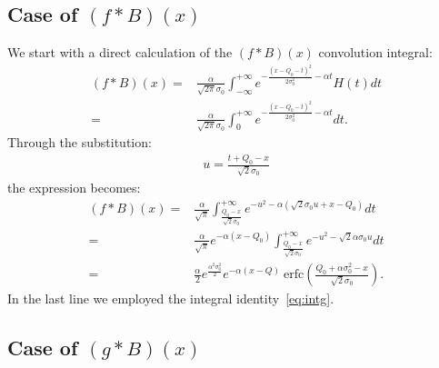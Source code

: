 \documentclass[a4paper,11pt]{article}
\begin{document}
\subsection*{Case of $(f*B)(x)$ }
%

We start with a direct calculation of the $(f*B)(x)$ convolution integral:
\begin{align}
(f*B)(x) = & \frac{\alpha}{\sqrt{2\pi}\sigma_0}   \int^{+\infty}_{-\infty} e^{ -\frac{(x-Q_0-t)^2}{2\sigma_0^2} -\alpha t } H(t) dt \nonumber \\
             = & \frac{\alpha}{\sqrt{2\pi}\sigma_0}  \int^{+\infty}_{0} e^{ -\frac{(x-Q_0-t)^2}{2\sigma_0^2} -\alpha t } dt.
\end{align}
Through the substitution:
\begin{align}
u = \frac{t+Q_0-x}{\sqrt{2}\sigma_0}  
\end{align}
the expression becomes:
\begin{align}
(f*B)(x) = & \frac{\alpha }{\sqrt{\pi}}   \int^{+\infty}_{ \frac{Q_0-x}{\sqrt{2}\sigma_0}   } e^{ -u^2 -\alpha( \sqrt{2}\sigma_0 u + x - Q_0 ) } dt \nonumber \\
            = & \frac{\alpha }{\sqrt{\pi}} e^{-\alpha(x-Q_0)} \int^{+\infty}_{ \frac{Q_0-x}{\sqrt{2}\sigma_0}   } e^{ -u^2 - \sqrt{2}\alpha\sigma_0 u  } dt  \nonumber \\
            = & \frac{\alpha }{2} e^{\frac{\alpha^2\sigma_0^2}{2}} e^{-\alpha(x-Q)} \ \text{erfc}\left(    \frac{Q_0 + \alpha\sigma_0^2 -x }{\sqrt{2}\sigma_0} \right).
\end{align}
In the last line we employed the integral identity~\eqref{eq:intg}. 


\subsection*{Case of $(g*B)(x)$ }
%
\end{document}
